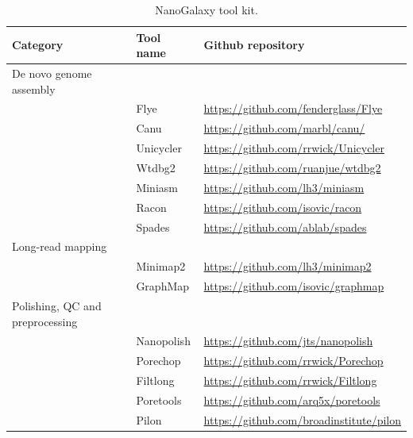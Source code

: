 \documentclass[a4paper,num-refs]{oup-contemporary}
\begin{document}
\begin{table}[b!]
\caption{NanoGalaxy tool kit.}\label{tab:NanoGalaxyToolkit}
\begin{tabularx}{\linewidth}{l l l}
\toprule
Category & Tool name & Github repository\\
\midrule
De novo genome assembly         &            &                                               \\
                                & Flye       & \url{https://github.com/fenderglass/Flye}     \\
                                & Canu       & \url{https://github.com/marbl/canu/}          \\
                                & Unicycler  & \url{https://github.com/rrwick/Unicycler}     \\
                                & Wtdbg2     & \url{https://github.com/ruanjue/wtdbg2}       \\
                                & Miniasm    & \url{https://github.com/lh3/miniasm}          \\
                                & Racon      & \url{https://github.com/isovic/racon}         \\
                                & Spades     & \url{https://github.com/ablab/spades}         \\
Long-read mapping               &            &                                               \\
                                & Minimap2   & \url{https://github.com/lh3/minimap2}         \\
                                & GraphMap   & \url{https://github.com/isovic/graphmap}      \\
Polishing, QC and preprocessing &            &                                               \\
                                & Nanopolish & \url{https://github.com/jts/nanopolish}       \\
                                & Porechop   & \url{https://github.com/rrwick/Porechop}      \\
                                & Filtlong   & \url{https://github.com/rrwick/Filtlong}      \\
                                & Poretools  & \url{https://github.com/arq5x/poretools}      \\
                                & Pilon      & \url{https://github.com/broadinstitute/pilon} \\

\end{tabularx}
\end{table}
\end{document}
